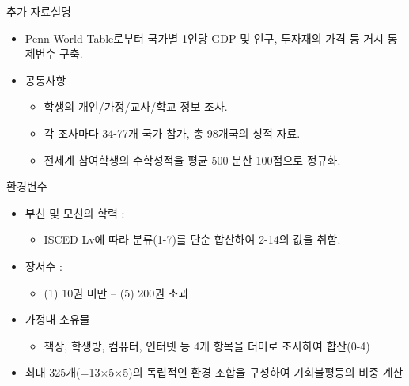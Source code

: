 \documentclass[aspectratio=169,xcolor=dvipsnames,handout]{beamer}
\begin{document}
\begin{frame}{추가 자료설명}
    \begin{itemize}
        \item Penn World Table로부터 국가별 1인당 GDP 및 인구, 투자재의 가격 등 거시 통제변수 구축.
        \item 공통사항
        \begin{itemize}
            \item 학생의 개인/가정/교사/학교 정보 조사.
            \item 각 조사마다 34-77개 국가 참가, 총 98개국의 성적 자료.
            \item 전세계 참여학생의 수학성적을 평균 500 분산 100점으로 정규화.
        \end{itemize}
    \end{itemize}
\end{frame}

\begin{frame}{환경변수}
    \begin{itemize}
    \item 부친 및 모친의 학력 :
    \begin{itemize}
        \item ISCED Lv에 따라 분류(1-7)를 단순 합산하여 2-14의 값을 취함.
    \end{itemize}
    \item 장서수 :
    \begin{itemize}
        \item (1) 10권 미만 -- (5) 200권 초과
    \end{itemize}
    \item 가정내 소유물
    \begin{itemize}
        \item 책상, 학생방, 컴퓨터, 인터넷 등 4개 항목을 더미로 조사하여 합산(0-4)
    \end{itemize}
    \item 최대 325개(=13$\times$5$\times$5)의 독립적인 환경 조합을 구성하여 기회불평등의 비중 계산
    \end{itemize}
\end{frame}
\end{document}
